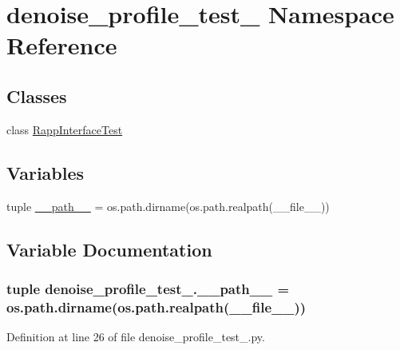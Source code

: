 \hypertarget{namespacedenoise__profile__test__1}{\section{denoise\-\_\-profile\-\_\-test\-\_ Namespace Reference}
\label{namespacedenoise__profile__test__1}
}
\subsection*{Classes}
\begin{DoxyCompactItemize}
\item 
class \hyperlink{classdenoise__profile__test__1_1_1RappInterfaceTest}{Rapp\-Interface\-Test}
\end{DoxyCompactItemize}
\subsection*{Variables}
\begin{DoxyCompactItemize}
\item 
tuple \hyperlink{namespacedenoise__profile__test__1_a861f5c753a68602b19b7e2f841932f0f}{\-\_\-\-\_\-path\-\_\-\-\_\-} = os.\-path.\-dirname(os.\-path.\-realpath(\-\_\-\-\_\-file\-\_\-\-\_\-))
\end{DoxyCompactItemize}


\subsection{Variable Documentation}
\hypertarget{namespacedenoise__profile__test__1_a861f5c753a68602b19b7e2f841932f0f}{
\subsubsection[{\-\_\-\-\_\-path\-\_\-\-\_\-}]{\setlength{\rightskip}{0pt plus 5cm}tuple denoise\-\_\-profile\-\_\-test\-\_.\-\_\-\-\_\-path\-\_\-\-\_\- = os.\-path.\-dirname(os.\-path.\-realpath(\-\_\-\-\_\-file\-\_\-\-\_\-))}}\label{namespacedenoise__profile__test__1_a861f5c753a68602b19b7e2f841932f0f}


Definition at line 26 of file denoise\-\_\-profile\-\_\-test\-\_.\-py.

